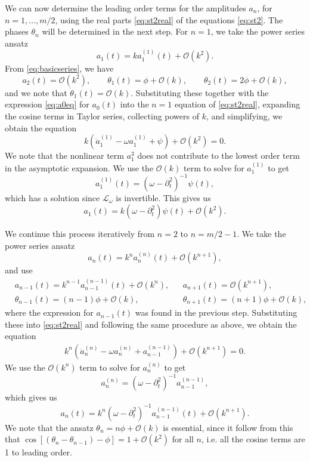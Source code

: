 \documentclass[11pt,reqno]{amsart}
\def\Lw{{\mathcal{L}_\omega}}
\begin{document}
We can now determine the leading order terms for the amplitudes $a_n$, for $n = 1, \dots, m/2$, using the real parts \cref{eq:st2real} of the equations \cref{eq:st2}. The phases $\theta_n$ will be determined in the next step. For $n=1$, we take the power series ansatz 
\[
a_1(t) = k a_1^{(1)}(t) + \mathcal{O}(k^2).
\]
From \cref{eq:basicseries}, we have
\[
a_2(t) = \mathcal{O}(k^2), \qquad \theta_1(t) = \phi + \mathcal{O}(k), \qquad \theta_2(t) = 2 \phi + \mathcal{O}(k),
\]
and we note that $\dot \theta_1(t) = \mathcal{O}(k)$. Substituting these together with the expression \cref{eq:a0eq} for $a_0(t)$ into the $n=1$ equation of \cref{eq:st2real}, expanding the cosine terms in Taylor series, collecting powers of $k$, and simplifying, we obtain the equation
\[
k\left(\ddot a_1^{(1)} - \omega a_1^{(1)} + \psi\right) + \mathcal{O}(k^2) = 0.
\]
We note that the nonlinear term $a_1^3$ does not contribute to the lowest order term in the asymptotic expansion. We use the $\mathcal{O}(k)$ term to solve for $a_1^{(1)}$ to get 
\begin{equation}\label{eq:a11}
a_1^{(1)}(t) = (\omega - \partial_t^2)^{-1} \psi(t),
\end{equation}
which has a solution since $\Lw$ is invertible. This gives us
\begin{equation}\label{eq:a1eq}
a_1(t) = k (\omega - \partial_t^2) \psi(t) + \mathcal{O}(k^2).
\end{equation}

We continue this process iteratively from $n=2$ to $n=m/2-1$. We take the power series ansatz 
\[
a_n(t) = k^n a_n^{(n)}(t) + \mathcal{O}(k^{n+1}),
\]
and use
\begin{align*}
&a_{n-1}(t) = k^{n-1} a_{n-1}^{(n-1)}(t) + \mathcal{O}(k^{n}), &&a_{n+1}(t) = \mathcal{O}(k^{n+1}), \\
&\theta_{n-1}(t) = (n-1) \phi + \mathcal{O}(k), &&\theta_{n+1}(t) = (n+1) \phi + \mathcal{O}(k),
\end{align*}
where the expression for $a_{n-1}(t)$ was found in the previous step. Substituting these into \cref{eq:st2real} and following the same procedure as above, we obtain the equation
\begin{align*}
k^n\left(\ddot a_n^{(n)} - \omega a_n^{(n)} + a_{n-1}^{(n-1)}\right) +\mathcal{O}(k^{n+1}) = 0.
\end{align*}
We use the $\mathcal{O}(k^n)$ term to solve for $a_n^{(n)}$ to get 
\begin{equation}\label{eq:ann}
a_n^{(n)} = (\omega - \partial_t^2)^{-1}a_{n-1}^{(n-1)},
\end{equation}
which gives us
\begin{equation}\label{eq:aneq}
a_n(t) = k^n (\omega - \partial_t^2)^{-1}a_{n-1}^{(n-1)}(t) + \mathcal{O}(k^{n+1}).
\end{equation}
We note that the ansatz $\theta_n = n \phi + \mathcal{O}(k)$ is essential, since it follow from this that $\cos[(\theta_n - \theta_{n-1}) - \phi] = 1 + \mathcal{O}(k^2)$ for all $n$, i.e. all the cosine terms are 1 to leading order. 
\end{document}
